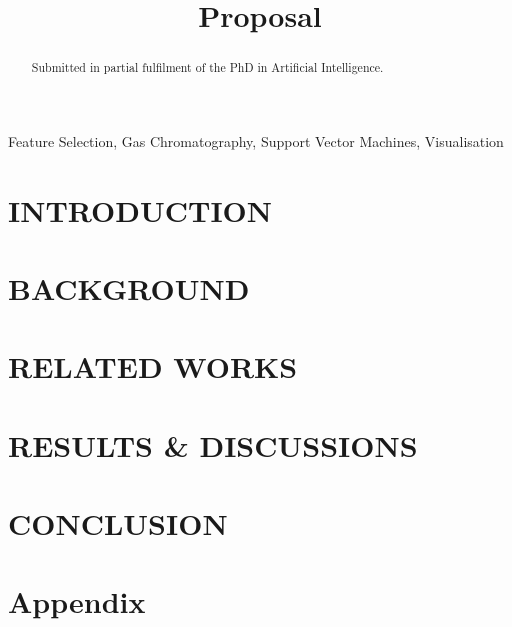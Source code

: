 \documentclass{article}
\title{Proposal}
\begin{document}
\maketitle
%
\begin{abstract}

  Submitted in partial fulfilment of the PhD in Artificial Intelligence.

\end{abstract}
%
\begin{keywords}
  Feature Selection, Gas Chromatography, Support Vector Machines, Visualisation
\end{keywords}
%

\section{INTRODUCTION}
\label{sec:introduction}

\cite{bi2020gc}

\section{BACKGROUND}
\label{sec:background}

\section{RELATED WORKS}
\label{sec:related-works}

\section{RESULTS \& DISCUSSIONS}
\label{sec:results}

\section{CONCLUSION}
\label{sec:conclusion}

\section{Appendix}
\label{sec:appendix}
\end{document}
